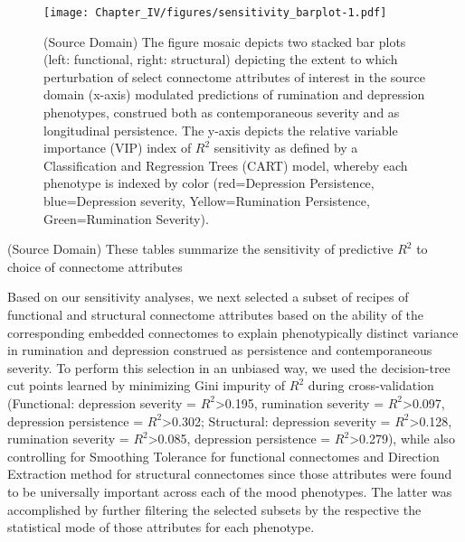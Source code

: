 \documentclass[
  notitlepage]{article}
\begin{document}
\begin{figure}
\centering
\texttt{[image: Chapter\_IV/figures/sensitivity\_barplot-1.pdf]}
\caption{(Source Domain) \label{fig:sensitivities_bar_plot_pheno}\scriptsize{The figure mosaic depicts two stacked bar plots (left: functional, right: structural) depicting the extent to which perturbation of select connectome attributes of interest in the source domain (x-axis) modulated predictions of rumination and depression phenotypes, construed both as contemporaneous severity and as longitudinal persistence. The y-axis depicts the relative variable importance (VIP) index of $R^{2}$ sensitivity as defined by a Classification and Regression Trees (CART) model, whereby each phenotype is indexed by color (red=Depression Persistence, blue=Depression severity, Yellow=Rumination Persistence, Green=Rumination Severity).}}
\end{figure}
\setlength{\belowcaptionskip}{-10pt}

\begin{table}
\begin{minipage}{\textwidth}
\centering
{}
\vspace{\baselineskip}
\end{minipage}
\caption{(Source Domain) \label{tab:sensitivity}\scriptsize{These tables summarize the sensitivity of predictive $R^{2}$ to choice of connectome attributes}}
\end{table}
\setlength{\belowcaptionskip}{-10pt}

Based on our sensitivity analyses, we next selected a subset of recipes
of functional and structural connectome attributes based on the ability
of the corresponding embedded connectomes to explain phenotypically
distinct variance in rumination and depression construed as persistence
and contemporaneous severity. To perform this selection in an unbiased
way, we used the decision-tree cut points learned by minimizing Gini
impurity of \(R^{2}\) during
cross-validation~\cite{Breiman1996} (Functional:
depression severity = \(R^{2}\)\textgreater0.195, rumination severity =
\(R^{2}\)\textgreater0.097, depression persistence =
\(R^{2}\)\textgreater0.302; Structural: depression severity =
\(R^{2}\)\textgreater0.128, rumination severity =
\(R^{2}\)\textgreater0.085, depression persistence =
\(R^{2}\)\textgreater0.279), while also controlling for Smoothing
Tolerance for functional connectomes and Direction Extraction method for
structural connectomes since those attributes were found to be
universally important across each of the mood phenotypes. The latter was
accomplished by further filtering the selected subsets by the respective
the statistical mode of those attributes for each phenotype.
\end{document}

